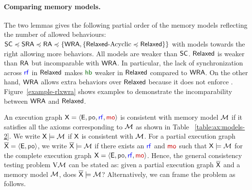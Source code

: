 \paragraph*{Comparing memory models.} The two lemmas gives the following partial order of the memory models reflecting the number of allowed behaviours: $\mathsf{SC}\preccurlyeq\mathsf{SRA}\preccurlyeq\mathsf{RA}\preccurlyeq\{\mathsf{WRA},\{\mathsf{Relaxed}\text{-Acyclic}\preccurlyeq\mathsf{Relaxed}\}\}$ with models towards the right allowing more behaviors.  All models are weaker than $\mathsf{SC}$. $\mathsf{Relaxed}$ is weaker than $\mathsf{RA}$ but incomparable with $\mathsf{WRA}$. In particular, the lack of synchronization across $\rf$
in $\mathsf{Relaxed}$ makes $\hb$ weaker in $\mathsf{Relaxed}$ compared to $\mathsf{WRA}$. On the other hand, $\mathsf{WRA}$ allows extra behaviors over $\mathsf{Relaxed}$ because it does not enforce \WRCoh{}. Figure~\ref{example-rlxwra} shows examples to demonstrate the incomparability between $\mathsf{WRA}$ and $\mathsf{Relaxed}$.

An execution graph $\ex = \tuple{\E, \po, \rf, \mo}$ is consistent with memory model $\mathcal{M}$ if it satisfies all the axioms corresponding to $\mathcal{M}$ as shown in Table  ~\ref{table:ax:models-2}. We write $\mathsf{\color{black}X} \models \mathcal{M}$ if $\mathsf{\color{black}X}$ is consistent with $\mathcal{M}$. For a partial execution graph $\expartial = \tuple{\E, \po}$, we write $\overline{\mathsf{\color{black}X}} \models \mathcal{M}$ if there exists an $\rf$ and $\mo$ such that $\mathsf{\color{black}X} \models \mathcal{M}$ for the complete execution graph $\ex = \tuple{\E, \po, \rf, \mo}$. Hence, the general consistency testing problem $\mathrm{V}\mathcal{M}$ can be stated as: given a partial execution graph $\overline{\mathsf{\color{black}X}}$ and a memory model $\mathcal{M}$, does $\overline{\mathsf{\color{black}X}} \models \mathcal{M}$? 
Alternatively, we can frame the problem as follows.
\begin{center}
\end{center}

